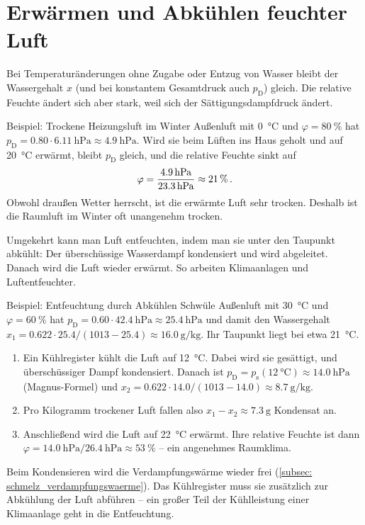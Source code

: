 \section{Erwärmen und Abkühlen feuchter Luft}\label{sec: feuchte_luft_erwaermen}
Bei Temperaturänderungen ohne Zugabe oder Entzug von Wasser bleibt der Wassergehalt $x$ (und bei konstantem Gesamtdruck auch $p_\text{D}$) gleich. Die relative Feuchte ändert sich aber stark, weil sich der Sättigungsdampfdruck ändert.

\begin{examplebox}[]{Beispiel: Trockene Heizungsluft im Winter}
    Außenluft mit \SI{0}{\celsius} und $\varphi = \SI{80}{\percent}$ hat $p_\text{D} = \num{0.80} \cdot \SI{6.11}{\hecto\pascal} \approx \SI{4.9}{\hecto\pascal}$. Wird sie beim Lüften ins Haus geholt und auf \SI{20}{\celsius} erwärmt, bleibt $p_\text{D}$ gleich, und die relative Feuchte sinkt auf
    \begin{equation*}
        \varphi = \frac{\SI{4.9}{\hecto\pascal}}{\SI{23.3}{\hecto\pascal}} \approx \SI{21}{\percent} \mDot
    \end{equation*}
    Obwohl draußen  Wetter herrscht, ist die erwärmte Luft sehr trocken. Deshalb ist die Raumluft im Winter oft unangenehm trocken.
\end{examplebox}

Umgekehrt kann man Luft entfeuchten, indem man sie unter den Taupunkt abkühlt: Der überschüssige Wasserdampf kondensiert und wird abgeleitet. Danach wird die Luft wieder erwärmt. So arbeiten Klimaanlagen und Luftentfeuchter.

\begin{examplebox}[]{Beispiel: Entfeuchtung durch Abkühlen}
    Schwüle Außenluft mit \SI{30}{\celsius} und $\varphi = \SI{60}{\percent}$ hat $p_\text{D} = \num{0.60} \cdot \SI{42.4}{\hecto\pascal} \approx \SI{25.4}{\hecto\pascal}$ und damit den Wassergehalt $x_1 = \num{0.622} \cdot \num{25.4}/(\num{1013} - \num{25.4}) \approx \SI{16.0}{\gram\per\kilogram}$. Ihr Taupunkt liegt bei etwa \SI{21}{\celsius}.
    \begin{enumerate}[itemsep=1.5pt]
        \item Ein Kühlregister kühlt die Luft auf \SI{12}{\celsius}. Dabei wird sie gesättigt, und überschüssiger Dampf kondensiert. Danach ist $p_\text{D} = p_\text{s}(\SI{12}{\celsius}) \approx \SI{14.0}{\hecto\pascal}$ (Magnus-Formel) und $x_2 = \num{0.622} \cdot \num{14.0}/(\num{1013} - \num{14.0}) \approx \SI{8.7}{\gram\per\kilogram}$.
        \item Pro Kilogramm trockener Luft fallen also $x_1 - x_2 \approx \SI{7.3}{\gram}$ Kondensat an.
        \item Anschließend wird die Luft auf \SI{22}{\celsius} erwärmt. Ihre relative Feuchte ist dann $\varphi = \SI{14.0}{\hecto\pascal}/\SI{26.4}{\hecto\pascal} \approx \SI{53}{\percent}$ -- ein angenehmes Raumklima.
    \end{enumerate}
    Beim Kondensieren wird die Verdampfungswärme wieder frei (\cref{subsec: schmelz_verdampfungswaerme}). Das Kühlregister muss sie zusätzlich zur Abkühlung der Luft abführen -- ein großer Teil der Kühlleistung einer Klimaanlage geht in die Entfeuchtung.
\end{examplebox}


